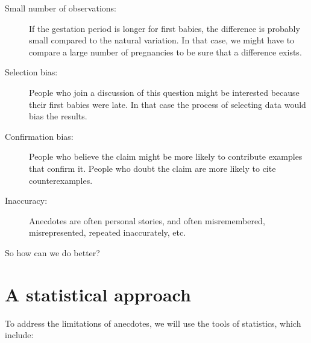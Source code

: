 \documentclass[12pt]{book}
\begin{document}
\begin{description}

\item[Small number of observations:] If the gestation period is longer
  for first babies, the difference is probably small compared to the
  natural variation.  In that case, we might have to compare a large
  number of pregnancies to be sure that a difference exists.


\item[Selection bias:] People who join a discussion of this question
  might be interested because their first babies were late.  In that
  case the process of selecting data would bias the results.


\item[Confirmation bias:] People who believe the claim might be more
  likely to contribute examples that confirm it.  People who doubt the
  claim are more likely to cite counterexamples.


\item[Inaccuracy:] Anecdotes are often personal stories, and often
  misremembered, misrepresented, repeated
  inaccurately, etc.

\end{description}

So how can we do better?

\section{A statistical approach}

To address the limitations of anecdotes, we will use the tools
of statistics, which include:
\end{document}
